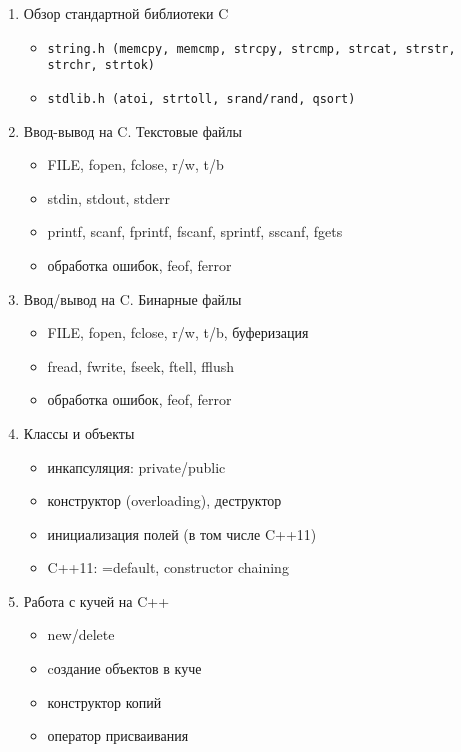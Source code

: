 \begin{enumerate}[noitemsep]
\begin{itemize}[noitemsep]
\end{itemize}
\item{Обзор стандартной библиотеки C}
\begin{itemize}[noitemsep]
    \item \begin{verbatim}string.h (memcpy, memcmp, strcpy, strcmp, strcat, strstr, strchr, strtok)\end{verbatim}
    \item \begin{verbatim}stdlib.h (atoi, strtoll, srand/rand, qsort)\end{verbatim}
\end{itemize}
\item{Ввод-вывод на C. Текстовые файлы}
\begin{itemize}[noitemsep]
    \item FILE, fopen, fclose, r/w, t/b
    \item stdin, stdout, stderr
    \item printf, scanf, fprintf, fscanf, sprintf, sscanf, fgets
    \item обработка ошибок, feof, ferror
\end{itemize}
\item{Ввод/вывод на C. Бинарные файлы}
\begin{itemize}[noitemsep]
    \item FILE, fopen, fclose, r/w, t/b, буферизация
    \item fread, fwrite, fseek, ftell, fflush
    \item обработка ошибок, feof, ferror
\end{itemize}
\item{Классы и объекты}
\begin{itemize}[noitemsep]
    \item инкапсуляция: private/public
    \item конструктор (overloading), деструктор
    \item инициализация полей (в том числе C++11)
    \item C++11: =default, constructor chaining
\end{itemize}
\item{Работа с кучей на C++}
\begin{itemize}[noitemsep]
    \item new/delete
    \item cоздание объектов в куче
    \item конструктор копий
    \item оператор присваивания

\end{itemize}
\end{enumerate}
